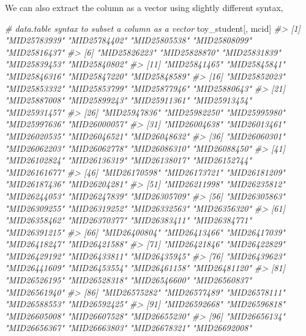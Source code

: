 \documentclass[
]{book}
\newenvironment{Shaded}{\begin{snugshade}}{\end{snugshade}}
\newcommand{\CommentTok}[1]{\textcolor[rgb]{0.56,0.35,0.01}{\textit{#1}}}
\newcommand{\NormalTok}[1]{#1}
\begin{document}
We can also extract the column as a vector using slightly different syntax,

\begin{Shaded}
\begin{Highlighting}[]
\CommentTok{\# data.table syntax to subset a column as a vector}
\NormalTok{toy\_student[, mcid]}
\CommentTok{\#\textgreater{}   [1] "MID25783939" "MID25784402" "MID25805538" "MID25808099" "MID25816437"}
\CommentTok{\#\textgreater{}   [6] "MID25826223" "MID25828870" "MID25831839" "MID25839453" "MID25840802"}
\CommentTok{\#\textgreater{}  [11] "MID25841465" "MID25845841" "MID25846316" "MID25847220" "MID25848589"}
\CommentTok{\#\textgreater{}  [16] "MID25852023" "MID25853332" "MID25853799" "MID25877946" "MID25880643"}
\CommentTok{\#\textgreater{}  [21] "MID25887008" "MID25899243" "MID25911361" "MID25913454" "MID25931457"}
\CommentTok{\#\textgreater{}  [26] "MID25947836" "MID25982250" "MID25995980" "MID25997636" "MID26000057"}
\CommentTok{\#\textgreater{}  [31] "MID26004638" "MID26013461" "MID26020535" "MID26046521" "MID26048632"}
\CommentTok{\#\textgreater{}  [36] "MID26060301" "MID26062203" "MID26062778" "MID26086310" "MID26088450"}
\CommentTok{\#\textgreater{}  [41] "MID26102824" "MID26136319" "MID26138017" "MID26152744" "MID26161677"}
\CommentTok{\#\textgreater{}  [46] "MID26170598" "MID26173721" "MID26181209" "MID26187436" "MID26204281"}
\CommentTok{\#\textgreater{}  [51] "MID26211998" "MID26235812" "MID26244053" "MID26247839" "MID26305709"}
\CommentTok{\#\textgreater{}  [56] "MID26305863" "MID26309255" "MID26319252" "MID26332563" "MID26356320"}
\CommentTok{\#\textgreater{}  [61] "MID26358462" "MID26370377" "MID26383411" "MID26384771" "MID26391215"}
\CommentTok{\#\textgreater{}  [66] "MID26400804" "MID26413466" "MID26417039" "MID26418247" "MID26421588"}
\CommentTok{\#\textgreater{}  [71] "MID26421846" "MID26422829" "MID26429192" "MID26433811" "MID26435945"}
\CommentTok{\#\textgreater{}  [76] "MID26439623" "MID26441609" "MID26453554" "MID26461158" "MID26481120"}
\CommentTok{\#\textgreater{}  [81] "MID26526195" "MID26528318" "MID26546600" "MID26560837" "MID26561940"}
\CommentTok{\#\textgreater{}  [86] "MID26575282" "MID26577489" "MID26578111" "MID26588553" "MID26592425"}
\CommentTok{\#\textgreater{}  [91] "MID26592668" "MID26596818" "MID26605008" "MID26607528" "MID26655230"}
\CommentTok{\#\textgreater{}  [96] "MID26656134" "MID26656367" "MID26663803" "MID26678321" "MID26692008"}
\end{Highlighting}
\end{Shaded}
\end{document}
